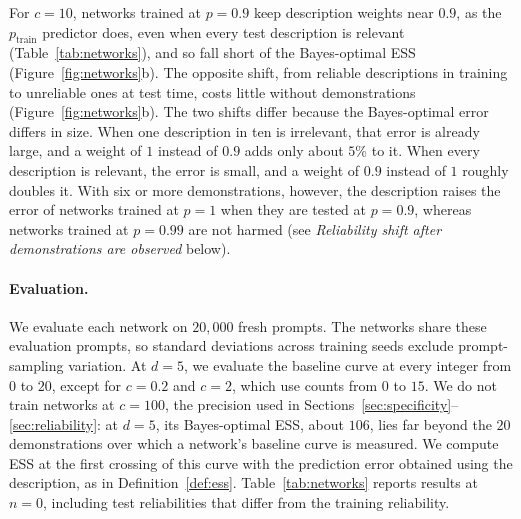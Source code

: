 \documentclass{article}
\theoremstyle{definition}
\begin{document}
For $c=10$, networks trained at $p=0.9$ keep description weights near $0.9$, as the $p_{\mathrm{train}}$ predictor does, even when every test description is relevant (Table~\ref{tab:networks}), and so fall short of the Bayes-optimal ESS (Figure~\ref{fig:networks}b). The opposite shift, from reliable descriptions in training to unreliable ones at test time, costs little without demonstrations (Figure~\ref{fig:networks}b). The two shifts differ because the Bayes-optimal error differs in size. When one description in ten is irrelevant, that error is already large, and a weight of $1$ instead of $0.9$ adds only about $5\%$ to it. When every description is relevant, the error is small, and a weight of $0.9$ instead of $1$ roughly doubles it. With six or more demonstrations, however, the description raises the error of networks trained at $p=1$ when they are tested at $p=0.9$, whereas networks trained at $p=0.99$ are not harmed (see \emph{Reliability shift after demonstrations are observed} below).

\paragraph{Evaluation.}
We evaluate each network on $20{,}000$ fresh prompts. The networks share these evaluation prompts, so standard deviations across training seeds exclude prompt-sampling variation. At $d = 5$, we evaluate the baseline curve at every integer from $0$ to $20$, except for $c = 0.2$ and $c = 2$, which use counts from $0$ to $15$. We do not train networks at $c=100$, the precision used in Sections~\ref{sec:specificity}--\ref{sec:reliability}: at $d=5$, its Bayes-optimal ESS, about $106$, lies far beyond the $20$ demonstrations over which a network's baseline curve is measured. We compute ESS at the first crossing of this curve with the prediction error obtained using the description, as in Definition~\ref{def:ess}. Table~\ref{tab:networks} reports results at $n = 0$, including test reliabilities that differ from the training reliability.
\end{document}
